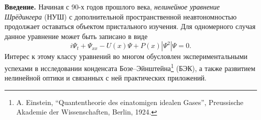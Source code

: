 \documentclass[candidate, href, colorlinks]{disser}
\begin{document}
%	
%	
%
%
%
%
%
%


\textbf{Введение.}
Начиная с 90-х годов прошлого века, {\it нелинейное уравнение Шрёдингера} (НУШ) с дополнительной пространственной неавтономностью продолжает оставаться объектом пристального изучения.
Для одномерного случая данное уравнение может быть записано в виде
\begin{equation}
	i \Psi_t + \Psi_{xx} - U(x) \Psi + P(x) |\Psi^2| \Psi = 0.
\label{eq:gpe}
\end{equation}
Интерес к этому классу уравнений во многом обусловлен экспериментальными успехами в исследовании конденсата Бозе--Эйнштейна\footnote{A. Einstein, ``Quantentheorie des einatomigen idealen Gases'', Preussische Akademie der Wissenschaften, Berlin, 1924.} (БЭК), а также развитием нелинейной оптики и связанных с ней практических приложений.
\end{document}
